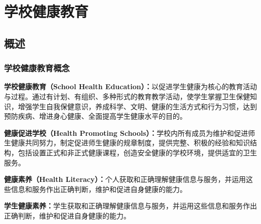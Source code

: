 \chapter{学校健康教育}
\setcounter{chapter}{11}

\section{概述}

\subsection{学校健康教育概念}

\begin{keybox}
\textbf{学校健康教育（School Health Education）：}以促进学生健康为核心的教育活动与过程。通过有计划、有组织、多种形式的教育教学活动，使学生掌握卫生保健知识，增强学生自我保健意识，养成科学、文明、健康的生活方式和行为习惯，达到预防疾病、增进身心健康、全面提高学生健康水平的目的。
\end{keybox}

\begin{defbox}
\textbf{健康促进学校（Health Promoting Schools）：}学校内所有成员为维护和促进师生健康共同努力，制定促进师生健康的规章制度，提供完整、积极的经验和知识结构，包括设置正式和非正式健康课程，创造安全健康的学校环境，提供适宜的卫生服务。

\textbf{健康素养（Health Literacy）：}个人获取和正确理解健康信息与服务，并运用这些信息和服务作出正确判断，维护和促进自身健康的能力。

\textbf{学生健康素养：}学生获取和正确理解健康信息与服务，并运用这些信息和服务作出正确判断，维护和促进自身健康的能力。
\end{defbox}

